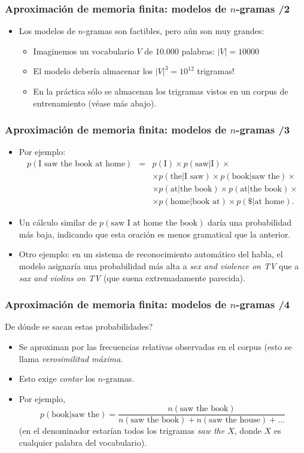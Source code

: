 \begin{frame}
  \frametitle{Aproximación de memoria finita: modelos de \(n\)-gramas /2}
  \begin{itemize}
  \item Los modelos de \(n\)-gramas son factibles, pero aún son muy grandes:
    \begin{itemize}
    \item Imaginemos un vocabulario \(V\) de 10.000 palabras: \(|V|=10000\)
    \item El modelo debería almacenar los \(|V|^3=10^{12}\) trigramas!
    \item En la práctica sólo se almacenan los trigramas vistos en un corpus de entrenamiento (véase más abajo).
    \end{itemize}
  \end{itemize}

\end{frame}

\begin{frame}
  \frametitle{Aproximación de memoria finita: modelos de \(n\)-gramas /3} 
\begin{itemize}
\item Por ejemplo:
\[
\begin{array}{rcl}
 p(\mbox{I saw the book at home})  &=& p(\mbox{I})\times p(\mbox{saw}|\mbox{I}) \times \\
 && \times p(\mbox{the}|\mbox{I saw}) \times  p(\mbox{book}|\mbox{saw the}) \times 
\\
 && \times p(\mbox{at}|\mbox{the book}) \times p(\mbox{at}|\mbox{the book}) \times \\
 && \times  p(\mbox{home}|\mbox{book at}) \times p(\$|\mbox{at home}).
\end{array}
\]
\item Un cálculo similar de \(p(\mbox{saw I at home the book})\) daría una probabilidad más baja, indicando que esta oración es menos gramatical que la anterior.
\item Otro ejemplo: en un sistema de reconocimiento automático del habla, el modelo asignaría una probabilidad más alta a \emph{sex and violence on TV} que a \emph{sax and violins on TV} (que suena extremadamente parecida).
\end{itemize}
\end{frame}

\begin{frame}
  \frametitle{Aproximación de memoria finita: modelos de \(n\)-gramas /4} 
De dónde se sacan estas probabilidades?
\begin{itemize}
\item Se aproximan por las frecuencias relativas observadas en el corpus (esto se llama \emph{verosimilitud máxima}.
\item Esto exige \emph{contar} los \(n\)-gramas.
\item Por ejemplo, 
\[
p(\mbox{book}|\mbox{saw the})=\frac{n(\mbox{saw the book})}{n(\mbox{saw the book}) +n(\mbox{saw the house}) + \ldots }
\]
(en el denominador estarían todos los trigramas \emph{saw the \(X\)}, donde \(X\) es cualquier palabra del vocabulario).

\end{itemize}
\end{frame}


